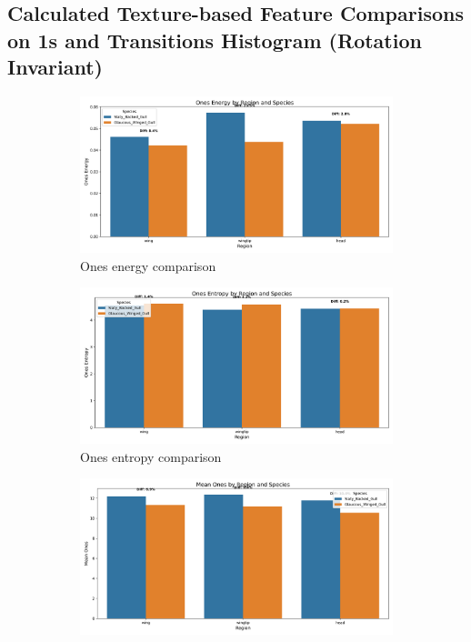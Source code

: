 \documentclass[a4paper,12pt]{report}
\begin{document}
\subsection{Calculated Texture-based Feature Comparisons on 1s and Transitions Histogram (Rotation Invariant)}
\begin{figure}[H]
    \centering
    \begin{subfigure}[b]{0.48\textwidth}
        \includegraphics[width=\textwidth]{images/appendix/Original/ones_energy_comparison.png}
        \caption{Ones energy comparison}
    \end{subfigure}
    \hfill
    \begin{subfigure}[b]{0.48\textwidth}
        \includegraphics[width=\textwidth]{images/appendix/Original/ones_entropy_comparison.png}
        \caption{Ones entropy comparison}
    \end{subfigure}
    \vspace{0.5cm}
    \begin{subfigure}[b]{0.48\textwidth}
        \includegraphics[width=\textwidth]{images/appendix/Original/mean_ones_comparison.png}

\end{subfigure}
\end{figure}
\end{document}
